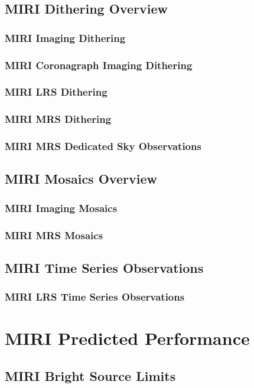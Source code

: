 \subsection{MIRI Dithering Overview}
\subsubsection{MIRI Imaging Dithering}
\subsubsection{MIRI Coronagraph Imaging Dithering}
\subsubsection{MIRI LRS Dithering}
\subsubsection{MIRI MRS Dithering}
\subsubsection{MIRI MRS Dedicated Sky Observations}

\subsection{MIRI Mosaics Overview}
\subsubsection{MIRI Imaging Mosaics}
\subsubsection{MIRI MRS Mosaics}

\subsection{MIRI Time Series Observations}
\subsubsection{MIRI LRS Time Series Observations}

\section{MIRI Predicted Performance}
\subsection{MIRI Bright Source Limits}
